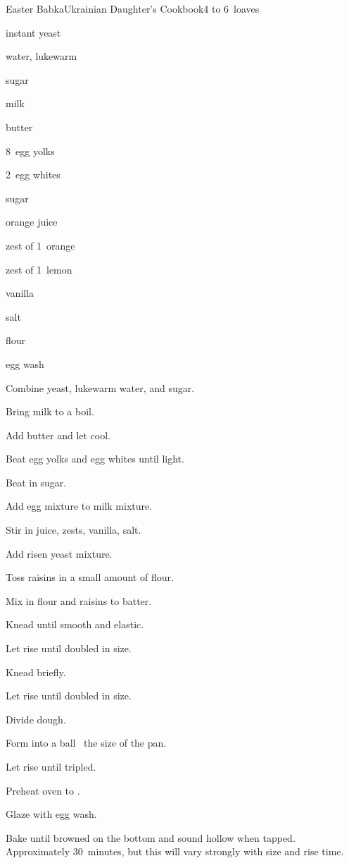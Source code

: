 \begin{recipe}{Easter Babka}{Ukrainian Daughter's Cookbook}{4 to 6~loaves}

\begin{ingredients}
\item {} instant yeast
\item \C{\third} water, lukewarm
\item {} sugar
\item {} milk
\item \C{\half} butter
\item 8~egg yolks
\item 2~egg whites
\item {} sugar
\item \C{\half} orange juice
\item zest of 1~orange
\item zest of 1~lemon
\item {} vanilla
\item {} salt
\item {} flour
\item \C{\half} 
\item egg wash
\end{ingredients}

\begin{directions}
\item Combine yeast, lukewarm water, and  sugar.
\item Bring milk to a boil.
\item Add butter and let cool.
\item Beat egg yolks and egg whites until light.
\item Beat in sugar.
\item Add egg mixture to milk mixture.
\item Stir in juice, zests, vanilla, salt.
\item Add risen yeast mixture.
\item Toss raisins in a small amount of flour.
\item Mix in flour and raisins to batter.
\item Knead until smooth and elastic.
\item Let rise until doubled in size.
\item Knead briefly.
\item Let rise until doubled in size.
\item Divide dough.
\item Form into a ball \third~the size of the pan.
\item Let rise until tripled.
\item Preheat oven to .
\item Glaze with egg wash.
\item Bake until browned on the bottom and sound hollow when tapped. Approximately 30~minutes, but this will vary strongly with size and rise time.
\end{directions}

\end{recipe}
